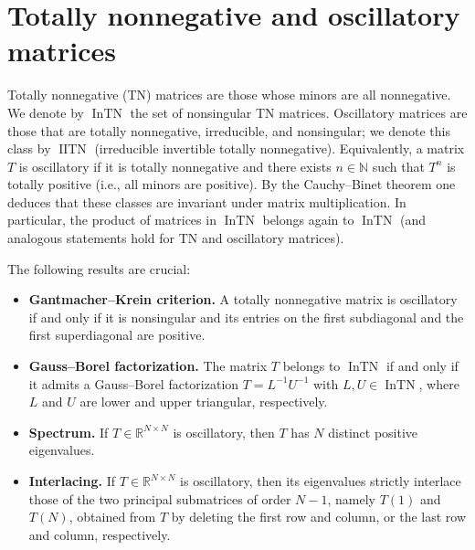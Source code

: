 \documentclass[11pt]{amsart}
\theoremstyle{plain}
\newcommand{\N}{\mathbb{N}}
\newcommand{\R}{\mathbb{R}}
\newcommand{\1}{\text{\fontseries{bx}\selectfont \textup 1}}
\begin{document}
\appendix

\section{Totally nonnegative and oscillatory matrices}

Totally nonnegative (TN) matrices are those whose minors are all nonnegative. We denote by $\operatorname{InTN}$ the set of nonsingular TN matrices. Oscillatory matrices are those that are totally nonnegative, irreducible, and nonsingular; we denote this class by $\operatorname{IITN}$ (irreducible invertible totally nonnegative). Equivalently, a matrix $T$ is oscillatory if it is totally nonnegative and there exists $n\in\N$ such that $T^n$ is totally positive (i.e., all minors are positive). By the Cauchy--Binet theorem one deduces that these classes are invariant under matrix multiplication. In particular, the product of matrices in $\operatorname{InTN}$ belongs again to $\operatorname{InTN}$ (and analogous statements hold for TN and oscillatory matrices).

The following results are crucial:
\begin{itemize}
	\item \textbf{Gantmacher--Krein criterion.}
	A totally nonnegative matrix is oscillatory if and only if it is nonsingular and its entries on the first subdiagonal and the first superdiagonal are positive.
	
	\item \textbf{Gauss--Borel factorization.}
	The matrix $T$ belongs to $\operatorname{InTN}$ if and only if it admits a Gauss--Borel factorization $T=L^{-1}U^{-1}$ with $L,U\in\operatorname{InTN}$, where $L$ and $U$ are lower and upper triangular, respectively.
	
	\item \textbf{Spectrum.}
	If $T\in\R^{N\times N}$ is oscillatory, then $T$ has $N$ distinct positive eigenvalues.
	
	\item \textbf{Interlacing.}
	If $T\in\R^{N\times N}$ is oscillatory, then its eigenvalues strictly interlace those of the two principal submatrices of order $N-1$, namely $T(1)$ and $T(N)$, obtained from $T$ by deleting the first row and column, or the last row and column, respectively.
\end{itemize}
\end{document}
